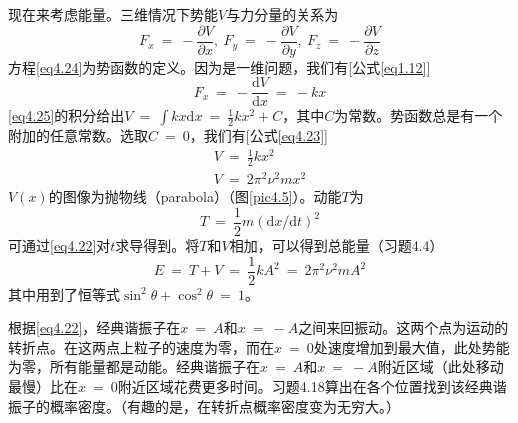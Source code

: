 \documentclass[12pt,a4paper,openany]{ctexbook}
\newcommand{\dd}[1]{\mathrm{d} #1}
\begin{document}
\begin{flushleft}
现在来考虑能量。三维情况下势能$V$与力分量的关系为
\begin{equation}
    \boxed{F_x\ =\ -\frac{\partial V}{\partial x},\ F_y\ =\ -\frac{\partial V}{\partial y},\ F_z\ =\ -\frac{\partial V}{\partial z}} \label{eq4.24}
\end{equation}
方程\eqref{eq4.24}为势函数的定义。因为是一维问题，我们有[公式\eqref{eq1.12}]
\begin{equation}
    F_x\ =\ -\frac{\dd V}{\dd x}\ =\ -kx \label{eq4.25}
\end{equation}
\eqref{eq4.25}的积分给出$V\ =\ \int kx\dd x\ =\ \frac{1}{2}kx^2+C$，其中$C$为常数。势函数总是有一个附加的任意常数。选取$C\ =\ 0$，我们有[公式\eqref{eq4.23}]
\begin{gather}
    \boxed{V\ =\ \frac{1}{2}kx^2} \label{eq4.26} \\
    V\ =\ 2\pi^2\nu^2mx^2 \label{eq4.27}
\end{gather}
$V(x)$的图像为抛物线（parabola）（图\ref{pic4.5}）。动能$T$为
\begin{equation}
    T\ =\ \frac{1}{2}m(\dd x/\dd t)^2 \label{eq4.28}
\end{equation}
可通过\eqref{eq4.22}对$t$求导得到。将$T$和$V$相加，可以得到总能量（习题4.4）
\begin{equation}
    E\ =\ T+V\ =\ \frac{1}{2}kA^2\ =\ 2\pi^2\nu^2mA^2 \label{eq4.29}
\end{equation}
其中用到了恒等式$\sin^2\theta+\cos^2\theta\ =\ 1$。

根据\eqref{eq4.22}，经典谐振子在$x\ =\ A$和$x\ =\ -A$之间来回振动。这两个点为运动的转折点。在这两点上粒子的速度为零，而在$x\ =\ 0$处速度增加到最大值，此处势能为零，所有能量都是动能。经典谐振子在$x\ =\ A$和$x\ =\ -A$附近区域（此处移动最慢）比在$x\ =\ 0$附近区域花费更多时间。习题4.18算出在各个位置找到该经典谐振子的概率密度。（有趣的是，在转折点概率密度变为无穷大。）
\end{flushleft}
\end{document}
